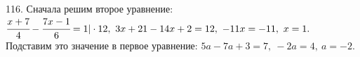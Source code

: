 116. Сначала решим второе уравнение: $\cfrac{x+7}{4}-\cfrac{7x-1}{6}=1|\cdot12,\ 3x+21-14x+2=12,\ -11x=-11,\ x=1.$ Подставим это значение в первое уравнение:
$5a-7a+3=7,\ -2a=4,\ a=-2.$\\
